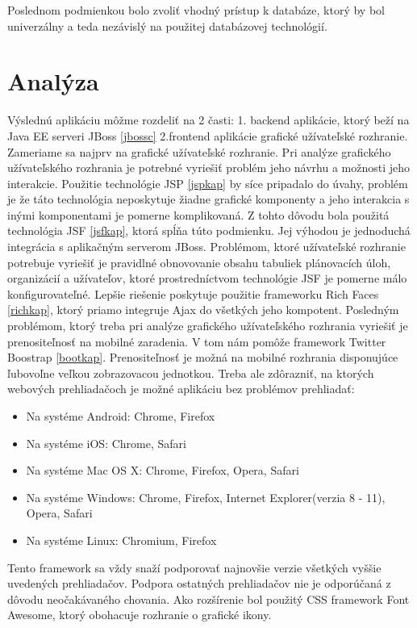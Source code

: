 Poslednom podmienkou bolo zvoliť vhodný prístup k databáze, ktorý by bol univerzálny a teda nezávislý na použitej databázovej technológií.

\section{Analýza}
Výslednú aplikáciu môžme rozdeliť na 2 časti: 1. backend aplikácie, ktorý beží na Java EE serveri JBoss \ref{jbossc} 2.frontend aplikácie grafické užívateľské rozhranie. Zameriame sa najprv na grafické užívateľské rozhranie. Pri analýze grafického užívateľského rozhrania je potrebné vyriešiť problém jeho návrhu a možnosti jeho interakcie. Použitie technológie JSP \ref{jspkap} by síce pripadalo do úvahy, problém je že táto technológia neposkytuje žiadne grafické komponenty a jeho interakcia s inými komponentami je pomerne komplikovaná. Z tohto dôvodu bola použitá technológia JSF \ref{jsfkap}, ktorá spĺňa túto podmienku. Jej výhodou je jednoduchá integrácia s aplikačným serverom JBoss. Problémom, ktoré užívateľské rozhranie potrebuje vyriešiť je pravidlné obnovovanie obsahu tabuliek plánovacích úloh, organizácií a užívateľov, ktoré prostredníctvom technológie JSF je pomerne málo konfigurovateľné. Lepšie riešenie poskytuje použitie frameworku Rich Faces \ref{richkap}, ktorý priamo integruje Ajax \cite{ajaxbook} do všetkých jeho kompotent. Posledným problémom, ktorý treba pri analýze grafického užívateľského rozhrania vyriešiť je prenositeľnosť na mobilné zaradenia. V tom nám pomôže framework Twitter Boostrap \ref{bootkap}. Prenositeľnosť je možná na mobilné rozhrania disponujúce ľubovoľne veľkou zobrazovacou jednotkou. Treba ale zdôrazniť, na ktorých webových prehliadačoch je možné aplikáciu bez problémov prehliadať:
\begin{itemize}
\item Na systéme Android: Chrome, Firefox
\item Na systéme iOS: Chrome, Safari
\item Na systéme Mac OS X: Chrome, Firefox, Opera, Safari
\item Na systéme Windows: Chrome, Firefox, Internet Explorer(verzia 8 - 11), Opera, Safari
\item Na systéme Linux: Chromium, Firefox
\end{itemize}
Tento framework sa vždy snaží podporovať najnovšie verzie všetkých vyššie uvedených prehliadačov. Podpora ostatných prehliadačov nie je odporúčaná z dôvodu neočakávaného chovania. Ako rozšírenie bol použitý CSS framework Font Awesome\cite{fontweb}, ktorý obohacuje rozhranie o grafické ikony.

